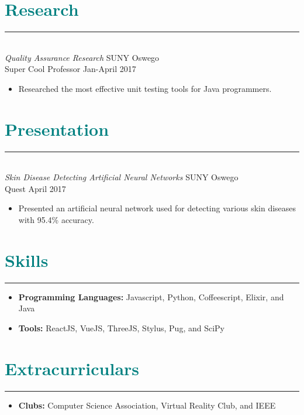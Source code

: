 \documentclass[11pt]{article}
\begin{document}
\section*{\textcolor{teal}{Research}}
\hrule
\vspace{4px}
\hfill \\
\textit{
    \large{Quality Assurance Research}
}
\hfill
\small{SUNY Oswego} \\
\small{Super Cool Professor}
\hfill
Jan-April 2017 
\begin{itemize}
    \item Researched the most effective unit testing tools for Java programmers.
\end{itemize}

\section*{\textcolor{teal}{Presentation}}
\hrule
\vspace{4px}
\hfill \\
\textit{
    \normalsize{Skin Disease Detecting Artificial Neural Networks}
}
\hfill
\small{SUNY Oswego} \\
\small{Quest}
\hfill
April 2017 
\begin{itemize}
    \item Presented an artificial neural network used for detecting various skin diseases with 95.4\% accuracy.
\end{itemize}

\section*{\textcolor{teal}{Skills}}
\hrule
\hfill
\begin{itemize}
    \item \textbf{Programming Languages:} Javascript, Python, Coffeescript, Elixir, and Java 
    \item \textbf{Tools:} ReactJS, VueJS, ThreeJS, Stylus, Pug, and SciPy
\end{itemize}

\section*{\textcolor{teal}{Extracurriculars}}
\hrule
\vspace{2px}
\begin{itemize}
    \item \textbf{Clubs:} Computer Science Association, Virtual Reality Club, and IEEE
\end{itemize}
\end{document}
